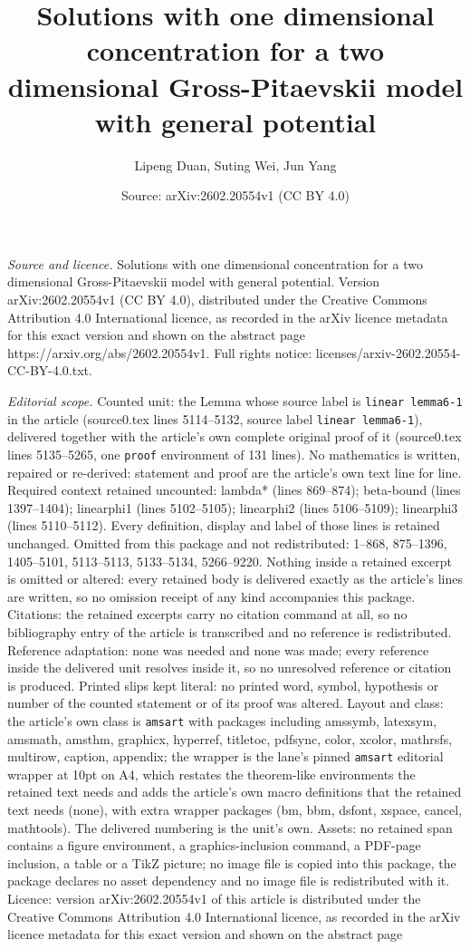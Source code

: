 \documentclass[10pt,a4paper]{amsart}
\title[Solutions with one dimensional concentration for a two dimen]{Solutions with one dimensional concentration for a two dimensional Gross-Pitaevskii model with general potential}
\author{Lipeng Duan, Suting Wei, Jun Yang}
\date{Source: arXiv:2602.20554v1 (CC BY 4.0)}
\begin{document}
\maketitle

\noindent\emph{Source and licence.} Solutions with one dimensional concentration for a two dimensional Gross-Pitaevskii model with general potential. Version arXiv:2602.20554v1 (CC BY 4.0), distributed under the Creative Commons Attribution 4.0 International licence, as recorded in the arXiv licence metadata for this exact version and shown on the abstract page https://arxiv.org/abs/2602.20554v1. Full rights notice: licenses/arxiv-2602.20554-CC-BY-4.0.txt.\par\smallskip

\noindent\textit{Editorial scope.} Counted unit: the Lemma whose source label is \texttt{linear lemma6-1} in the article (source0.tex lines 5114--5132, source label \texttt{linear lemma6-1}), delivered together with the article's own complete original proof of it (source0.tex lines 5135--5265, one \texttt{proof} environment of 131 lines). No mathematics is written, repaired or re-derived: statement and proof are the article's own text line for line. Required context retained uncounted: lambda* (lines 869--874); beta-bound (lines 1397--1404); linearphi1 (lines 5102--5105); linearphi2 (lines 5106--5109); linearphi3 (lines 5110--5112). Every definition, display and label of those lines is retained unchanged. Omitted from this package and not redistributed: 1--868, 875--1396, 1405--5101, 5113--5113, 5133--5134, 5266--9220. Nothing inside a retained excerpt is omitted or altered: every retained body is delivered exactly as the article's lines are written, so no omission receipt of any kind accompanies this package. Citations: the retained excerpts carry no citation command at all, so no bibliography entry of the article is transcribed and no reference is redistributed. Reference adaptation: none was needed and none was made; every reference inside the delivered unit resolves inside it, so no unresolved reference or citation is produced. Printed slips kept literal: no printed word, symbol, hypothesis or number of the counted statement or of its proof was altered. Layout and class: the article's own class is \texttt{amsart} with packages including amssymb, latexsym, amsmath, amsthm, graphicx, hyperref, titletoc, pdfsync, color, xcolor, mathrsfs, multirow, caption, appendix; the wrapper is the lane's pinned \texttt{amsart} editorial wrapper at 10pt on A4, which restates the theorem-like environments the retained text needs and adds the article's own macro definitions that the retained text needs (none), with extra wrapper packages (bm, bbm, dsfont, xspace, cancel, mathtools). The delivered numbering is the unit's own. Assets: no retained span contains a figure environment, a graphics-inclusion command, a PDF-page inclusion, a table or a TikZ picture; no image file is copied into this package, the package declares no asset dependency and no image file is redistributed with it. Licence: version arXiv:2602.20554v1 of this article is distributed under the Creative Commons Attribution 4.0 International licence, as recorded in the arXiv licence metadata for this exact version and shown on the abstract page 
\end{document}
